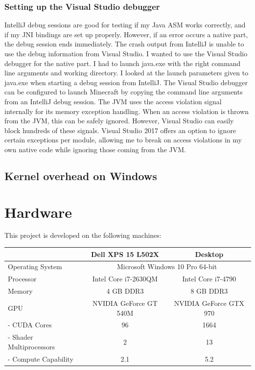 \documentclass[]{article}
\begin{document}
\subsubsection{Setting up the Visual Studio debugger}
IntelliJ debug sessions are good for testing if my Java ASM works correctly, and if my JNI bindings are set up properly.
However, if an error occurs a native part, the debug session ends immediately.
The crash output from IntelliJ is unable to use the debug information from Visual Studio.
I wanted to use the Visual Studio debugger for the native part.
I had to launch java.exe with the right command line arguments and working directory.
I looked at the launch parameters given to java.exe when starting a debug session from IntelliJ.
The Visual Studio debugger can be configured to launch Minecraft by copying the command line arguments from an IntelliJ debug session.
The JVM uses the access violation signal internally for its memory exception handling.
When an access violation is thrown from the JVM, this can be safely ignored.
However, Visual Studio can easily block hundreds of these signals.
Visual Studio 2017 offers an option to ignore certain exceptions per module, allowing me to break on access violations in my own native code while ignoring those coming from the JVM.

\subsection{Kernel overhead on Windows}

\section{Hardware}
This project is developed on the following machines:

\begin{center}
  \begin{tabular}{| l || c | c |} \hline
    & Dell XPS 15 L502X & Desktop \\ \hline
    Operating System & \multicolumn{2}{c|}{Microsoft Windows 10 Pro 64-bit} \\ \hline
    Processor & Intel Core i7-2630QM & Intel Core i7-4790 \\ \hline
    Memory & 4 GB DDR3 & 8 GB DDR3 \\ \hline \hline
    GPU & NVIDIA GeForce GT 540M & NVIDIA GeForce GTX 970\\ \hline
    - CUDA Cores & 96 & 1664 \\ \hline
    - Shader Multiprocessors & 2 & 13 \\ \hline
    - Compute Capability & 2.1 & 5.2 \\ \hline
  \end{tabular}
\end{center}
\end{document}
